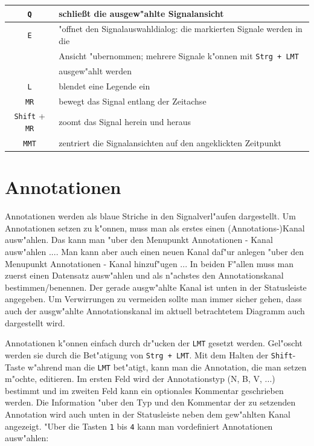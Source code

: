 \noindent
\begin{tabular}{c|l}
	\verb|Q| & schlie\ss t die ausgew"ahlte Signalansicht \\ \hline
	\verb|E| & "offnet den Signalauswahldialog: die markierten Signale werden in die\\
			 & Ansicht "ubernommen; mehrere Signale k"onnen mit \verb|Strg + LMT|\\
			 & ausgew"ahlt werden\\ \hline
	\verb|L| & blendet eine Legende ein\\ \hline
	\verb|MR| & bewegt das Signal entlang der Zeitachse\\ \hline
	\verb|Shift| + \verb|MR| & zoomt das Signal herein und heraus\\\hline
	\verb|MMT| & zentriert die Signalansichten auf den angeklickten Zeitpunkt\\
\end{tabular}

\section{Annotationen}

Annotationen werden als blaue Striche in den Signalverl"aufen dargestellt.
Um Annotationen setzen zu k"onnen, muss man als erstes einen (Annotations-)Kanal ausw"ahlen.
Das kann man "uber den Menupunkt \textsf{Annotationen - Kanal ausw"ahlen ...}.
Man kann aber auch einen neuen Kanal daf"ur anlegen "uber den Menupunkt \textsf{Annotationen - Kanal hinzuf"ugen ...}
In beiden F"allen muss man zuerst einen Datensatz ausw"ahlen und als n"achstes den Annotationskanal bestimmen/benennen.
Der gerade ausgw"ahlte Kanal ist unten in der Statusleiste angegeben.
Um Verwirrungen zu vermeiden sollte man immer sicher gehen, dass auch der ausgw"ahlte Annotationskanal im aktuell betrachtetem Diagramm auch dargestellt wird.

Annotationen k"onnen einfach durch dr"ucken der \verb|LMT| gesetzt werden.
Gel"oscht werden sie durch die Bet"atigung von \verb|Strg + LMT|.
Mit dem Halten der \verb|Shift|-Taste w"ahrend man die \verb|LMT| bet"atigt, kann man die Annotation, die man setzen m"ochte, editieren.
Im ersten Feld wird der Annotationstyp (N, B, V, ...) bestimmt und im zweiten Feld kann ein optionales Kommentar geschrieben werden.
Die Information "uber den Typ und den Kommentar der zu setzenden Annotation wird auch unten in der Statusleiste neben dem gew"ahlten Kanal angezeigt.
"Uber die Tasten \verb|1| bis \verb|4| kann man vordefiniert Annotationen ausw"ahlen:


